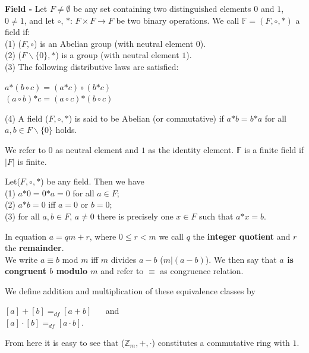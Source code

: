 \documentclass[a4paper]{article}
\begin{document}
\begin{definition}
\textbf{Field -} Let $F \neq \emptyset$ be any set containing two distinguished elements $0$ and $1$, $0 \neq 1$, and let $\circ$, $\mathcal{*}$: $F \times F \to F$ be two binary operations. We call $\mathbb{F} = (F, \circ, \mathcal{*})$ a field if:\\
(1) ($F, \circ$) is an Abelian group (with neutral element $0$).\\
(2) ($F \backslash \{0\}, \mathcal{*}$) is a group (with neutral element $1$).\\
(3) The following distributive laws are satisfied:
\begin{center}
$a \mathcal{*} (b \circ c) = (a \mathcal{*} c) \circ (b \mathcal{*} c)$\\
$(a \circ b) \mathcal{*} c = (a \circ c) \mathcal{*} (b \circ c)$
\end{center}
(4) A field ($F, \circ, \mathcal{*}$) is said to be Abelian (or commutative) if $a \mathcal{*} b = b \mathcal{*} a$ for all $a, b \in F \backslash \{0\}$ holds.
\end{definition}
We refer to $0$ as neutral element and $1$ as the identity element. $\mathbb{F}$ is a finite field if $|F|$ is finite.


\begin{theorem}
Let($F, \circ, \mathcal{*}$) be any field. Then we have\\
(1) $a \mathcal{*} 0 = 0 \mathcal{*} a = 0$ for all $a \in F$;\\
(2) $a \mathcal{*} b = 0$ iff $a = 0$ or $b = 0$;\\
(3) for all $a, b \in F$, $a \neq 0$ there is precisely one $x \in F$ such that $a \mathcal{*} x = b$.
\end{theorem}


In equation $a = qm + r$, where $0 \leq r < m$ we call $q$ the \textbf{integer quotient} and $r$ the \textbf{remainder}.\\
We write $a \equiv b$ mod $m$ iff $m$ divides $a -b$ ($m|(a-b)$). We then say that \textbf{$a$ is congruent $b$ modulo $m$} and refer to $\equiv$ as congruence relation.
\begin{definition}
We define addition and multiplication of these equivalence classes by\\
\begin{center}
$[a] + [b] =_{df} [a+b]$ $\quad$ and\\
$[a] \cdot [b] =_{df} [a \cdot b]$. $\qquad$
\end{center}
\end{definition}
From here it is easy to see that ($\mathbb{Z}_{m}, +, \cdot$) constitutes a commutative ring with $1$.
\end{document}
